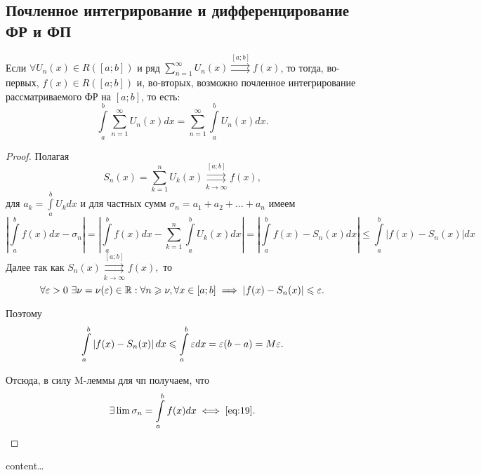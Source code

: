 \documentclass[../../main.tex]{subfiles}
\begin{document}
\subsection{Почленное интегрирование и дифференцирование ФР и ФП}

\begin{thm}
	Если $\forall U_n(x) \in R([a; b])$  и ряд $\sum\limits_{n = 1}^{\infty} 
	U_n(x) \overset{[a; b]}{\rightrightarrows} f(x)$, то тогда, во-первых, $f(x) 
	\in R([a; b])$ и, во-вторых, возможно почленное интегрирование 
	рассматриваемого ФР на $[a; b]$, то есть:
	\begin{equation} \label{eq:19}
	\int\limits_{a}^{b} \sum\limits_{n = 1}^{\infty}  U_n(x) dx = \sum\limits_{n 
	= 1}^{\infty}  \int\limits_{a}^{b} U_n(x) dx.
	\end{equation}
	
\end{thm}

\begin{proof}
	Полагая \[
	S_n(x) = \sum\limits_{k = 1}^{n} U_k(x) \overset{[a; b]}{\underset{k \to 
	\infty}\rightrightarrows} f(x),
	\]
	для
	$
	a_k = \int \limits_{a}^{b}U_k dx 
	$ 
	и для частных сумм 
	$
	\sigma_n = a_1 + a_2 + \ldots + a_n
	$
	имеем
	\[
		\left| \int \limits_{a}^{b} f(x) dx - \sigma_n \right| = 
		\left| \int \limits_{a}^{b} f(x) dx - 
		\sum\limits_{k = 1}^{n} \int \limits_{a}^{b} U_k(x) dx \right| =
		\left| \int \limits_{a}^{b} f(x) - 
		S_n(x) dx \right| \le
		\int \limits_{a}^{b} \left| f(x) - 
		S_n(x)  \right|	dx
	\]
	Далее так как $S_n(x)\overset{[a; b]}{\underset{k \to 
	\infty}\rightrightarrows} f(x),$ то 
	\[
	\forall \varepsilon > 0 \ \exists \nu = \nu(\varepsilon) \in \mathbb{R} : \forall n \geqslant \nu, 
	\forall x \in [a; b] \implies 
	|f(x) - S_n(x)| \leqslant \varepsilon.
	\]
	
	Поэтому
	\[
		\int \limits_{a}^{b} \left| f(x) - S_n(x)  \right|	dx \leqslant \int 
		\limits_{a}^{b} \varepsilon dx =
		\varepsilon(b - a) = M\varepsilon.
	\]
	
	Отсюда, в силу M-леммы для чп получаем, что
	\[
		\exists \lim \sigma_n = \int \limits_{a}^{b} f(x)dx \iff \eqref{eq:19}.
	\]
\end{proof}

\begin{crl*}
	content\dots
\end{crl*}
\end{document}
